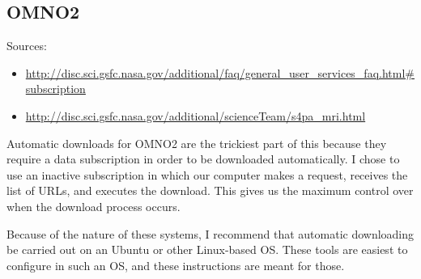 \documentclass[12pt]{article}
\begin{document}
\subsection{OMNO2}
	Sources:
	\begin{itemize}
	\item \url{http://disc.sci.gsfc.nasa.gov/additional/faq/general_user_services_faq.html#subscription}
	\item \url{http://disc.sci.gsfc.nasa.gov/additional/scienceTeam/s4pa_mri.html}
	\end{itemize}

	Automatic downloads for OMNO2 are the trickiest part of this because they require a data subscription in order to be downloaded automatically. I chose to use an inactive subscription in which our computer makes a request, receives the list of URLs, and executes the download.  This gives us the maximum control over when the download process occurs.
	
	Because of the nature of these systems, I recommend that automatic downloading be carried out on an Ubuntu or other Linux-based OS.  These tools are easiest to configure in such an OS, and these instructions are meant for those.
	
\end{document}
